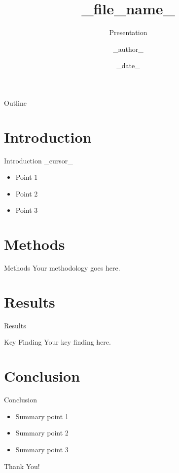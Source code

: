 \documentclass[aspectratio=169]{beamer}
\title{{{_file_name_}}}
\subtitle{Presentation}
\author{{{_author_}}}
\date{{{\_date\_}}}
\begin{document}
\begin{frame}
    \titlepage
\end{frame}

\begin{frame}{Outline}
    \tableofcontents
\end{frame}

\section{Introduction}

\begin{frame}{Introduction}
    {{_cursor_}}
    \begin{itemize}
        \item Point 1
        \item Point 2
        \item Point 3
    \end{itemize}
\end{frame}

\section{Methods}

\begin{frame}{Methods}
    Your methodology goes here.
\end{frame}

\section{Results}

\begin{frame}{Results}
    \begin{block}{Key Finding}
        Your key finding here.
    \end{block}
\end{frame}

\section{Conclusion}

\begin{frame}{Conclusion}
    \begin{itemize}
        \item Summary point 1
        \item Summary point 2
        \item Summary point 3
    \end{itemize}
\end{frame}

\begin{frame}
    \centering
    \Huge Thank You!
\end{frame}
\end{document}
